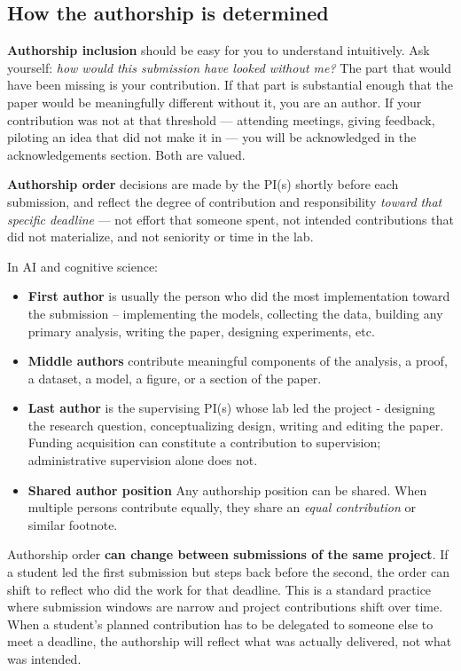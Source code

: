 \documentclass[11pt, letterpaper]{article}
\begin{document}
\subsection{How the authorship is determined}

\textbf{Authorship inclusion} should be easy for you to understand intuitively. Ask yourself: \textit{how would this submission have looked without me?}  The part that would have been missing is your contribution. If that part is substantial enough that the paper would be meaningfully different without it, you are an author. If your contribution was not at that threshold --- attending meetings, giving feedback, piloting an idea that did not make it in --- you will be acknowledged in the acknowledgements section. Both are valued.


\textbf{Authorship order} decisions are made by the PI(s) shortly before each submission, and reflect the degree of contribution and responsibility \textit{toward that specific deadline} --- not effort that someone spent, not intended contributions that did not materialize, and not seniority or time in the lab.

In AI and cognitive science:

\begin{itemize}[itemsep=0.2em]
    \item \textbf{First author} is usually the person who did the most implementation toward the submission --  implementing the models, collecting the data, building any primary analysis, writing the paper, designing experiments, etc. 
    \item \textbf{Middle authors} contribute meaningful components of the analysis, a proof, a dataset, a model, a figure, or a section of the paper. 
    \item \textbf{Last author} is the supervising PI(s) whose lab led the project - designing the research question,  conceptualizing design, writing and editing the paper. Funding acquisition can constitute a contribution to supervision; administrative supervision alone does not. 
    \item \textbf{Shared author position}
    Any authorship position can be shared. When multiple persons contribute equally, they share an \textit{equal contribution} or similar footnote. 
\end{itemize}

Authorship order \textbf{can change between submissions of the same project}. If a student led the first submission but steps back before the second, the order can shift to reflect who did the work for that deadline. This is a standard practice where submission windows are narrow and project contributions shift over time. When a student's planned contribution has to be delegated to someone else to meet a deadline, the authorship will reflect what was actually delivered, not what was  intended.
\end{document}
